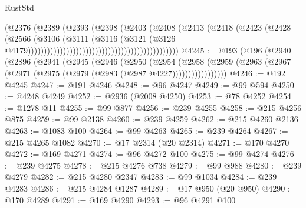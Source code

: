 \begin{lexlean}{RustStd}
\begin{coremodule}
                                                                  (@2376
                                                                    (@2389
                                                                      (@2393
                                                                        (@2398
                                                                          (@2403
                                                                            (@2408
                                                                              (@2413
                                                                                (@2418
                                                                                  (@2423
                                                                                    (@2428
                                                                                      (@2566
                                                                                        (@3106
                                                                                          (@3111
                                                                                            (@3116
                                                                                              (@3121
                                                                                                (@3126
                                                                                                  @4179)))))))))))))))))))))))))))))))))))))))))))))))
@4245 := @193
    (@196
      (@2940
        (@2896
          (@2941
            (@2945
              (@2946
                (@2950
                  (@2954
                    (@2958
                      (@2959 (@2963 (@2967 (@2971 (@2975 (@2979 (@2983 (@2987 @4227)))))))))))))))))
@4246 := @192 @4245
@4247 := @191 @4246
@4248 := @96 @4247
@4249 := @99 @594
@4250 := @4248 @4249
@4252 := @2936 (@2008 @4250)
@4253 := @78 @4252
@4254 := @1278 @11
@4255 := @99 @877
@4256 := @239 @4255
@4258 := @215 @4256 @875
@4259 := @99 @2138
@4260 := @239 @4259
@4262 := @215 @4260 @2136
@4263 := @1083 @100
@4264 := @99 @4263
@4265 := @239 @4264
@4267 := @215 @4265 @1082
@4270 := @17 @2314 (@20 @2314)
@4271 := @170 @4270
@4272 := @169 @4271
@4274 := @96 @4272 @100
@4275 := @99 @4274
@4276 := @239 @4275
@4278 := @215 @4276 @738
@4279 := @99 @988
@4280 := @239 @4279
@4282 := @215 @4280 @2347
@4283 := @99 @1034
@4284 := @239 @4283
@4286 := @215 @4284 @1287
@4289 := @17 @950 (@20 @950)
@4290 := @170 @4289
@4291 := @169 @4290
@4293 := @96 @4291 @100

\end{coremodule}
\end{lexlean}
